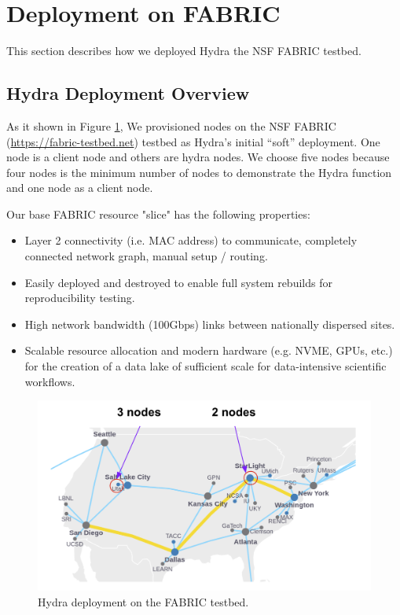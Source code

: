 \section{Deployment on FABRIC} \label{sec:fabric}
This section describes how we deployed Hydra the NSF FABRIC testbed\cite{8972790}.

\subsection{Hydra Deployment Overview}
As it shown in Figure \ref{fig:nodes-on-fabric}, We provisioned nodes on the NSF FABRIC (\url{https://fabric-testbed.net}) testbed as Hydra’s initial “soft” deployment. One node is a client node and others are hydra nodes. We choose five nodes because four nodes is the minimum number of nodes to demonstrate the Hydra function and one node as a client node. 

Our base FABRIC resource "slice" has the following properties:
\begin{itemize}
    \item Layer 2 connectivity (i.e. MAC address) to communicate, completely connected network graph, manual setup / routing.
    \item Easily deployed and destroyed to enable full system rebuilds for reproducibility testing. 
    \item High network bandwidth (100Gbps) links between nationally dispersed sites.
    \item Scalable resource allocation and modern hardware (e.g. NVME, GPUs, etc.) for the creation of a data lake of sufficient scale for data-intensive scientific workflows.
\end{itemize}

\begin{figure}[!ht]
    \centering
    \includegraphics[width=\columnwidth]{visuals/deploy-on-fabric.png}
    \caption{Hydra deployment on the FABRIC testbed.}
    \label{fig:nodes-on-fabric}
\end{figure}

